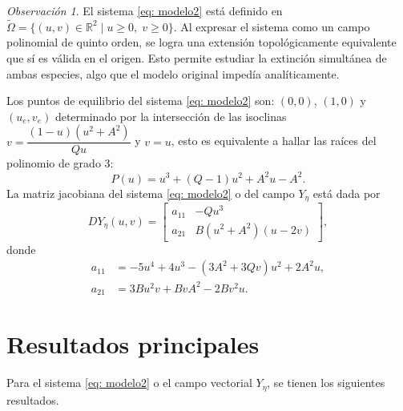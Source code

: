 \documentclass[]{article}
\theoremstyle{remark}
\newtheorem{remark}{Observación}
\begin{document}
	\begin{remark}
		El sistema \eqref{eq: modelo2} está definido en $\tilde{\Omega} = \{ (u, v) \in \mathbb{R}^{2} \; | \; u \geq 0, \; v \geq 0 \}.$ Al expresar el sistema como un campo polinomial de quinto orden, se logra una extensión topológicamente equivalente que sí es válida en el origen. Esto permite estudiar la extinción simultánea de ambas especies, algo que el modelo original impedía analíticamente.\\
	\end{remark}
	
	Los puntos de equilibrio del sistema \eqref{eq: modelo2} son: $(0,0)$, $(1,0)$ y $(u_e, v_e)$ determinado por la intersección de las isoclinas $v = \dfrac{(1-u)(u^2 + A^2)}{Q u}$ y $v = u$, esto es equivalente a hallar las raíces del polinomio de grado 3:
	\begin{equation}
		P(u) = u^{3} + (Q-1)u^{2} + A^{2}u - A^{2}.
		\label{eq: polinomioIsoclinasModelo2}
	\end{equation}
	La matriz jacobiana del sistema \eqref{eq: modelo2} o del campo $Y_\eta$ está dada por
	\begin{equation}
		DY_\eta(u,v) =
		\begin{bmatrix}
			a_{11} & -Qu^{3} \\
			a_{21} & B(u^{2}+A^{2})(u-2v)
		\end{bmatrix},
		\label{eq: jacobianaModelo2}
	\end{equation}
	donde
	\begin{equation*}
		\begin{aligned}
			a_{11} &= -5u^{4} + 4u^{3} - (3A^{2} + 3Qv)u^{2} + 2A^{2}u, \\
			a_{21} &= 3Bu^{2}v+BvA^{2}-2Bv^{2}u.
		\end{aligned}
	\end{equation*}
	
	\section{Resultados principales}
	Para el sistema \eqref{eq: modelo2} o el campo vectorial $Y_{\eta}$, se tienen los siguientes resultados.
	
\end{document}
